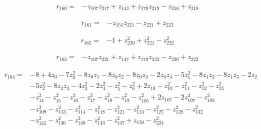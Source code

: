 \par\noindent\begin{minipage}{\linewidth}
\begin{align*}
r_{160}={}&-z_{107}z_{217}+z_{143}+z_{170}z_{219}-z_{216}+z_{218}
\end{align*}
\end{minipage}\par
\par\noindent\begin{minipage}{\linewidth}
\begin{align*}
r_{161}={}&-z_{151}z_{221}-z_{221}+z_{222}
\end{align*}
\end{minipage}\par
\par\noindent\begin{minipage}{\linewidth}
\begin{align*}
r_{162}={}&-1+z_{220}^{2}+z_{221}^{2}-z_{222}^{2}
\end{align*}
\end{minipage}\par
\par\noindent\begin{minipage}{\linewidth}
\begin{align*}
r_{163}={}&-z_{107}z_{221}+z_{147}+z_{170}z_{223}-z_{220}+z_{222}
\end{align*}
\end{minipage}\par
\par\noindent\begin{minipage}{\linewidth}
\begin{align*}
r_{164}={}&-8+4z_{0}-7z_{0}^{2}-8z_{0}z_{1}-8z_{0}z_{2}-8z_{0}z_{3}-2z_{0}z_{4}-5z_{1}^{2}-8z_{1}z_{2}-8z_{1}z_{3}-2z_{2}\\[-2pt]
&-5z_{2}^{2}-8z_{2}z_{3}-4z_{3}^{2}-2z_{4}^{2}-z_{5}^{2}-z_{6}^{2}+2z_{10}-z_{10}^{2}-z_{11}^{2}-z_{12}^{2}-z_{13}^{2}\\[-2pt]
&-z_{14}^{2}-z_{15}^{2}-z_{16}^{2}-z_{17}^{2}-z_{18}^{2}-z_{19}^{2}-z_{105}^{2}+2z_{107}-2z_{107}^{2}-z_{108}^{2}\\[-2pt]
&-z_{109}^{2}-z_{113}^{2}-z_{114}^{2}-z_{118}^{2}-z_{121}^{2}-z_{124}^{2}-z_{127}^{2}-z_{128}^{2}-z_{132}^{2}\\[-2pt]
&-z_{135}^{2}-z_{136}^{2}-z_{140}^{2}-z_{143}^{2}-z_{147}^{2}+z_{150}-z_{224}^{2}
\end{align*}
\end{minipage}\par

